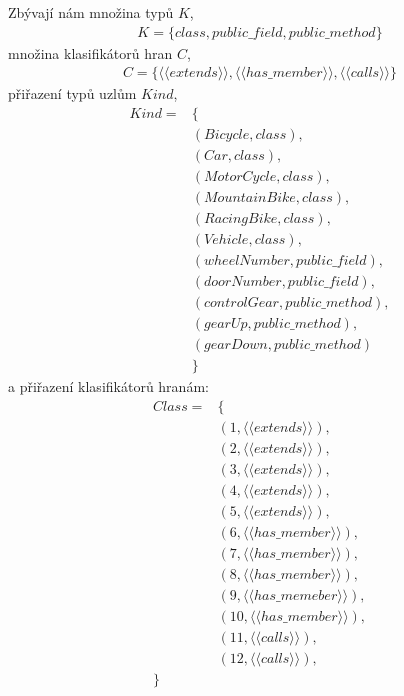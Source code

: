 Zbývají nám množina typů $K$,
\begin{align*}
  K = \{ class, public\_field, public\_method \}
\end{align*}
množina klasifikátorů hran $C$,
\begin{align*}
  C = \{ \langle\langle{}extends\rangle\rangle, \langle\langle{}has\_member\rangle\rangle, \langle\langle{}calls\rangle\rangle \}
\end{align*}
přiřazení typů uzlům $Kind$,
\begin{align*}
  Kind = &\{ \\
  &(Bicycle, class), \\
  &(Car, class), \\
  &(MotorCycle, class), \\
  &(MountainBike, class), \\
  &(RacingBike, class), \\
  &(Vehicle, class), \\
  &(wheelNumber, public\_field), \\
  &(doorNumber, public\_field), \\
  &(controlGear, public\_method), \\
  &(gearUp, public\_method), \\
  &(gearDown, public\_method) \\
  &\}
\end{align*}
a přiřazení klasifikátorů hranám:
\begin{align*}
  Class = &\{ \\
  &(1, \langle\langle{}extends\rangle\rangle), \\
  &(2, \langle\langle{}extends\rangle\rangle), \\
  &(3, \langle\langle{}extends\rangle\rangle), \\
  &(4, \langle\langle{}extends\rangle\rangle), \\
  &(5, \langle\langle{}extends\rangle\rangle), \\
  &(6, \langle\langle{}has\_member\rangle\rangle), \\
  &(7, \langle\langle{}has\_member\rangle\rangle), \\
  &(8, \langle\langle{}has\_member\rangle\rangle), \\
  &(9, \langle\langle{}has\_memeber\rangle\rangle), \\
  &(10, \langle\langle{}has\_member\rangle\rangle), \\
  &(11, \langle\langle{}calls\rangle\rangle), \\
  &(12, \langle\langle{}calls\rangle\rangle), \\
  \}
\end{align*}

